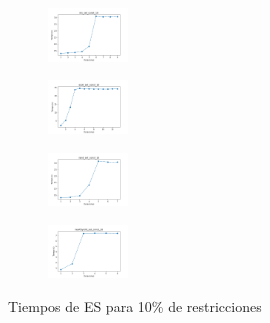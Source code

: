 \begin{figure}[H]
\begin{subfigure}
    \end{subfigure}
    \hfill
    \begin{subfigure}
        \centering
        \includegraphics[width=0.234\textwidth]{img/es/iris_set_const_10_3773969821_time.png}
    \end{subfigure}
    \hfill
    \begin{subfigure}
        \centering
        \includegraphics[width=0.234\textwidth]{img/es/ecoli_set_const_10_3773969821_time.png}
    \end{subfigure}
    \hfill
    \begin{subfigure}
        \centering
        \includegraphics[width=0.234\textwidth]{img/es/rand_set_const_10_3773969821_time.png}
    \end{subfigure}
    \hfill
    \begin{subfigure}
        \centering
        \includegraphics[width=0.234\textwidth]{img/es/newthyroid_set_const_10_3773969821_time.png}
    \end{subfigure}
    \caption{Tiempos de ES para 10\% de restricciones}
\end{figure}

\vspace*{\fill}
\newpage
\vspace*{\fill}

